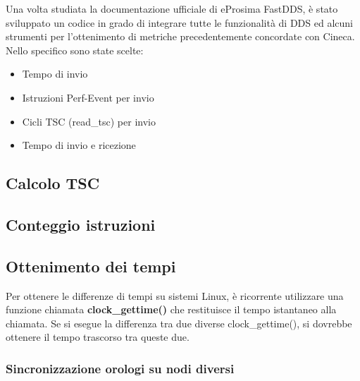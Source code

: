 Una volta studiata la documentazione ufficiale di eProsima FastDDS, è stato sviluppato un codice in grado di integrare tutte le funzionalità di DDS ed alcuni strumenti per l'ottenimento di metriche precedentemente concordate con Cineca\cite{TODO}. Nello specifico sono state scelte:
\begin{itemize}
    \item Tempo di invio
    \item Istruzioni Perf-Event per invio
    \item Cicli TSC (read\_tsc) per invio
    \item Tempo di invio e ricezione
\end{itemize}
\subsection{Calcolo TSC}
\subsection{Conteggio istruzioni}

\subsection{Ottenimento dei tempi}
Per ottenere le differenze di tempi su sistemi Linux, è ricorrente utilizzare una funzione chiamata \textbf{clock\_gettime()} che restituisce il tempo istantaneo alla chiamata. Se si esegue la differenza tra due diverse clock\_gettime(), si dovrebbe ottenere il tempo trascorso tra queste due.


\subsubsection{Sincronizzazione orologi su nodi diversi}

